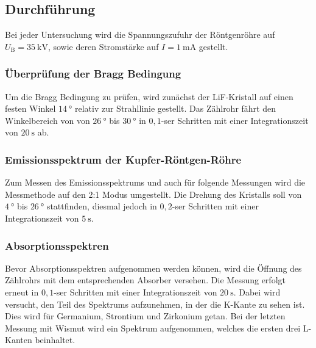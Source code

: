 \subsection{Durchführung}
\label{sec:durchführung}

Bei jeder Untersuchung wird die Spannungszufuhr der Röntgenröhre auf $U_{\text{B}} = \SI{35}{\kilo\volt}$, sowie deren Stromstärke auf $I = \SI{1}{\milli\ampere}$ gestellt.

\subsubsection{Überprüfung der Bragg Bedingung}
Um die Bragg Bedingung zu prüfen, wird zunächst der LiF-Kristall auf einen festen Winkel $\SI{14}{\degree}$ relativ zur Strahllinie gestellt.
Das Zählrohr fährt den Winkelbereich von von $\SI{26}{\degree}$ bis $\SI{30}{\degree}$ in $\si{0,1}$-ser Schritten mit einer Integrationszeit von $\SI{20}{\second}$ ab.

\subsubsection{Emissionsspektrum der Kupfer-Röntgen-Röhre}
Zum Messen des Emissionsspektrums und auch für folgende Messungen wird die Messmethode auf den 2:1 Modus umgestellt.
Die Drehung des Kristalls soll von $\SI{4}{\degree}$ bis $\SI{26}{\degree}$ stattfinden, diesmal jedoch in $\si{0,2}$-ser Schritten  mit einer Integrationszeit von $\SI{5}{\second}$.

\subsubsection{Absorptionsspektren}
Bevor Absorptionsspektren aufgenommen werden können, wird die Öffnung des Zählrohrs mit dem entsprechenden Absorber versehen.
Die Messung erfolgt erneut in $\si{0,1}$-ser Schritten mit einer Integrationszeit von $\SI{20}{\second}$.
Dabei wird versucht, den Teil des Spektrums aufzunehmen, in der die K-Kante zu sehen ist.
Dies wird für Germanium, Strontium und Zirkonium getan.
Bei der letzten Messung mit Wismut wird ein Spektrum aufgenommen, welches die ersten drei L-Kanten beinhaltet.
